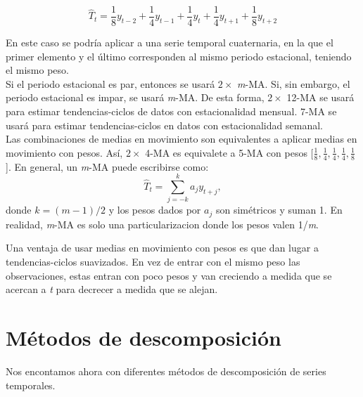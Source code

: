 \documentclass{article}
\begin{document}
        \begin{equation}
                \label{eq_2}
                \hat{T}_{t} = \frac{1}{8}y_{t-2}+\frac{1}{4}y_{t-1}+\frac{1}{4}y_{t}+\frac{1}{4}y_{t+1}+\frac{1}{8}y_{t+2}
        \end{equation}
        
        En este caso se podría aplicar a una serie temporal cuaternaria, en la que el primer elemento y el último corresponden al mismo periodo estacional, teniendo el mismo peso.\\

        Si el periodo estacional es par, entonces se usará $2 \times$ \textit{m}-MA. Si, sin embargo, el periodo estacional es impar, se usará \textit{m}-MA. De esta forma, $2 \times$ 12-MA se usará para estimar tendencias-ciclos de datos con estacionalidad mensual. 7-MA se usará para estimar tendencias-ciclos en datos con estacionalidad semanal.\\

        Las combinaciones de medias en movimiento son equivalentes a aplicar medias en movimiento con pesos. Así, $2 \times$ 4-MA es equivalete a 5-MA con pesos [$ \frac{1}{8},\frac{1}{4},\frac{1}{4},\frac{1}{4},\frac{1}{8}$]. En general, un \textit{m}-MA puede escribirse como:
        \begin{equation}
                \label{eq_}
                \hat{T}_{t} = \displaystyle\sum_{j=-k}^{k}a_{j}y_{t+j},
        \end{equation}
        donde $k = (m-1)/2$ y los pesos dados por $a_{j}$ son simétricos y suman 1. En realidad, \textit{m}-MA es solo una particularizacion donde los pesos valen 1/\textit{m}.\newline

        Una ventaja de usar medias en movimiento con pesos es que dan lugar a tendencias-ciclos suavizados. En vez de entrar con el mismo peso las observaciones, estas entran con poco pesos y van creciendo a medida que se acercan a \textit{t} para decrecer a medida que se alejan.

        \section{Métodos de descomposición}
        Nos encontamos ahora con diferentes métodos de descomposición de series temporales. 
\end{document}
